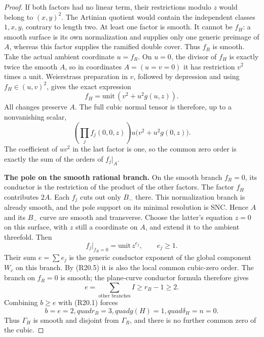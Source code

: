 \begin{proof}
If both factors had no linear term, their
restrictions modulo $z$ would belong to
$(x,y)^2$. The Artinian quotient would contain
the independent classes $1,x,y$, contrary to
length two. At least one factor is smooth.
It cannot be $f_H$: a smooth surface is its own
normalization and supplies only one generic
preimage of $A$, whereas this factor supplies
the ramified double cover. Thus $f_R$ is smooth.
Take the actual ambient coordinate $u=f_R$.
On $u=0$, the divisor of $f_H$ is exactly twice
the smooth $A$, so in coordinates
$A=(u=v=0)$ it has restriction $v^2$ times a
unit. Weierstrass preparation in $v$, followed
by depression and using $f_H\in(u,v)^2$, gives
the exact expression
\[
                    f_H=\text{unit}\,(v^2+u^2g(u,z)).     \tag{R20.4}
\]
All changes preserve $A$. The full cubic normal
tensor is therefore, up to a nonvanishing scalar,
\[
        \left(\prod_j f_j(0,0,z)\right)
                     u\bigl(v^2+u^2g(0,z)\bigr).          \tag{R20.5}
\]
The coefficient of $uv^2$ in the last factor is
one, so the common zero order is exactly the
sum of the orders of $f_j|_A$.

\par\medskip\noindent\textbf{The pole on the smooth rational branch.}
On the smooth branch $f_R=0$, its conductor is
the restriction of the product of the other
factors. The factor $f_H$ contributes $2A$.
Each $f_j$ cuts out only $B_-$ there. This
normalization branch is already smooth, and
the pole support on its minimal resolution is
SNC. Hence $A$ and its $B_-$ curve are smooth
and transverse. Choose the latter's equation
$z=0$ on this surface, with $z$ still a
coordinate on $A$, and extend it to the ambient
threefold. Then
\[
             f_j|_{f_R=0}=\text{unit}\,z^{e_j},
                  \qquad e_j\ge1.
\]
Their sum $e=\sum e_j$ is the generic conductor
exponent of the global component $W_c$ on
this branch. By (R20.5) it is also the local
common cubic-zero order. The branch on
$f_R=0$ is smooth; the plane-curve conductor
formula therefore gives
\[
          e=\sum_{\text{other branches}}I
                         \ge r_B-1\ge2.
\]
Combining $b\ge e$ with (R20.1) forces
\[
     b=e=2,quad r_B=3,quad
     g(H)=1,quad \delta_H=n=0.                         \tag{R20.6}
\]
Thus $\Gamma_H$ is smooth and disjoint from
$\Gamma_R$, and there is no further common
zero of the cubic.


\end{proof}
